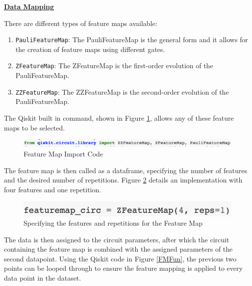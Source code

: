 \vspace{0.6cm}
\textbf{\underline{Data Mapping}}\label{FMapIMPle}

There are different types of feature maps available: 
\begin{enumerate}
 
\item \texttt{PauliFeatureMap}: The PauliFeatureMap is the general form and it allows for the creation of feature maps using different gates.

\item \texttt{ZFeatureMap}: The ZFeatureMap is the first-order evolution of the PauliFeatureMap.%

\item \texttt{ZZFeatureMap}: The ZZFeatureMap is the second-order evolution of the PauliFeatureMap. %

\end{enumerate}

The Qiskit built in command, shown in Figure \ref{FMImp},  allows any of these feature maps to be selected. %
\begin{figure}[H]
      \centering
      \includegraphics[scale=0.6]{background/FMapImp.png}
      \caption{Feature Map Import Code}
      \label{FMImp}
\end{figure}

The feature map is then called as a dataframe, specifying the number of features and the desired number of repetitions. Figure \ref{FMSpec} details an implementation with four features and one repetition. 

\begin{figure}[H]
      \centering
      \includegraphics[scale=0.7]{background/FMSpec.png}
      \caption{Specifying the features and repetitions for the Feature Map}
      \label{FMSpec}
\end{figure}

The data is then assigned to the circuit parameters, after which the circuit containing the feature map %
is combined with the assigned parameters of the second datapoint. 
Using the Qiskit code in Figure \ref{FMFun}, the previous two points can be looped through to ensure the feature mapping is applied to every data point in the dataset. 

